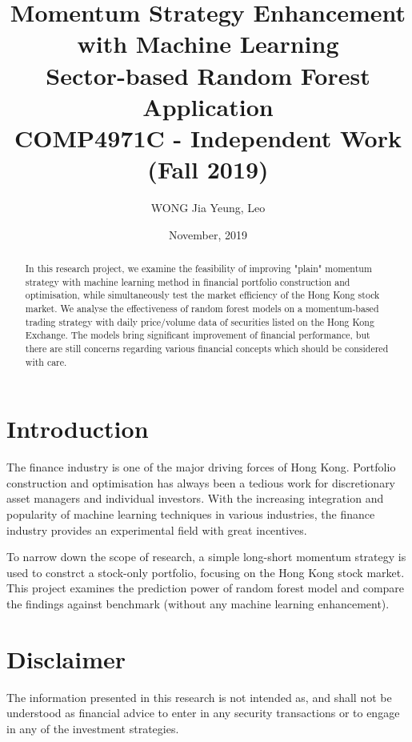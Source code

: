 \documentclass[12pt]{article}
\title{Momentum Strategy Enhancement \\ with Machine Learning \\[2ex]
  \large Sector-based Random Forest Application \\[4ex]
  \large COMP4971C - Independent Work (Fall 2019)}
\author{WONG Jia Yeung, Leo}
\date{November, 2019}
\begin{document}
\begin{titlingpage}
  \maketitle
  \begin{abstract}
    In this research project, we examine the feasibility of improving "plain" momentum strategy with machine learning method in financial portfolio construction and optimisation, while simultaneously test the market efficiency of the Hong Kong stock market. We analyse the effectiveness of random forest models on a momentum-based trading strategy with daily price/volume data of securities listed on the Hong Kong Exchange. The models bring significant improvement of financial performance, but there are still concerns regarding various financial concepts which should be considered with care.
  \end{abstract}
\end{titlingpage}


\tableofcontents


\section{Introduction}

The finance industry is one of the major driving forces of Hong Kong. Portfolio construction and optimisation has always been a tedious work for discretionary asset managers and individual investors. With the increasing integration and popularity of machine learning techniques in various industries, the finance industry provides an experimental field with great incentives.

To narrow down the scope of research, a simple long-short momentum strategy is used to constrct a stock-only portfolio, focusing on the Hong Kong stock market. This project examines the prediction power of random forest model and compare the findings against benchmark (without any machine learning enhancement).


\section{Disclaimer}

The information presented in this research is not intended as, and shall not be understood as financial advice to enter in any security transactions or to engage in any of the investment strategies.
\end{document}
